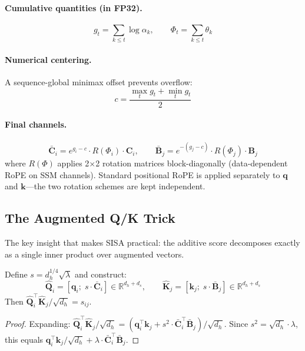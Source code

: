 \documentclass[11pt]{article}
\begin{document}
\paragraph{Cumulative quantities (in FP32).}
\begin{equation}
g_t = \sum_{k \leq t} \log \alpha_k, \qquad \Phi_t = \sum_{k \leq t} \theta_k
\end{equation}

\paragraph{Numerical centering.} A sequence-global minimax offset prevents overflow:
\begin{equation}
c = \frac{\max_t g_t + \min_t g_t}{2}
\end{equation}

\paragraph{Final channels.}
\begin{equation}
\bar{\mathbf{C}}_i = e^{g_i - c} \cdot R(\Phi_i) \cdot \mathbf{C}_i, \qquad
\bar{\mathbf{B}}_j = e^{-(g_j - c)} \cdot R(\Phi_j) \cdot \mathbf{B}_j
\end{equation}
where $R(\Phi)$ applies 2$\times$2 rotation matrices block-diagonally (data-dependent RoPE on SSM channels). Standard positional RoPE is applied separately to $\mathbf{q}$ and $\mathbf{k}$---the two rotation schemes are kept independent.

\subsection{The Augmented Q/K Trick}

The key insight that makes SISA practical: the additive score decomposes exactly as a single inner product over augmented vectors.

\begin{proposition}
Define $s = d_h^{1/4} \sqrt{\lambda}$ and construct:
\begin{equation}
\hat{\mathbf{Q}}_i = [\mathbf{q}_i;\; s \cdot \bar{\mathbf{C}}_i] \in \mathbb{R}^{d_h + d_s}, \qquad
\hat{\mathbf{K}}_j = [\mathbf{k}_j;\; s \cdot \bar{\mathbf{B}}_j] \in \mathbb{R}^{d_h + d_s}
\end{equation}
Then $\hat{\mathbf{Q}}_i^\top \hat{\mathbf{K}}_j / \sqrt{d_h} = s_{ij}$.
\end{proposition}

\begin{proof}
Expanding: $\hat{\mathbf{Q}}_i^\top \hat{\mathbf{K}}_j / \sqrt{d_h} = (\mathbf{q}_i^\top \mathbf{k}_j + s^2 \cdot \bar{\mathbf{C}}_i^\top \bar{\mathbf{B}}_j) / \sqrt{d_h}$. Since $s^2 = \sqrt{d_h} \cdot \lambda$, this equals $\mathbf{q}_i^\top \mathbf{k}_j / \sqrt{d_h} + \lambda \cdot \bar{\mathbf{C}}_i^\top \bar{\mathbf{B}}_j$.
\end{proof}
\end{document}
